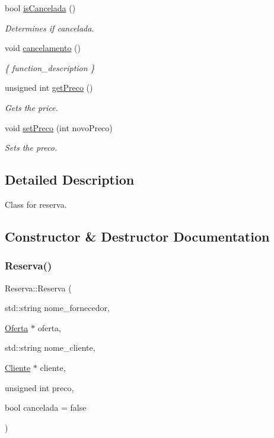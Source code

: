 \begin{DoxyCompactItemize}
bool \hyperlink{classReserva_a1fb3e7e1dfce5960dc888ac9929f014f}{is\+Cancelada} ()
\begin{DoxyCompactList}\small\item\em Determines if cancelada. \end{DoxyCompactList}\item 
\mbox{\label{classReserva_a05435b60142460ad2b0ccf61b7ea4531}} 
void \hyperlink{classReserva_a05435b60142460ad2b0ccf61b7ea4531}{cancelamento} ()
\begin{DoxyCompactList}\small\item\em \{ function\+\_\+description \} \end{DoxyCompactList}\item 
unsigned int \hyperlink{classReserva_a7d6a55cda46a28d62af5870c98cbc3d5}{get\+Preco} ()
\begin{DoxyCompactList}\small\item\em Gets the price. \end{DoxyCompactList}\item 
void \hyperlink{classReserva_ac2d3c756eb1abc03f0661cc97e1600e6}{set\+Preco} (int novo\+Preco)
\begin{DoxyCompactList}\small\item\em Sets the preco. \end{DoxyCompactList}\end{DoxyCompactItemize}


\subsection{Detailed Description}
Class for reserva. 

\subsection{Constructor \& Destructor Documentation}
\mbox{\label{classReserva_a96145a1381e9a9e5bb2091bb17e1d496}} 
\subsubsection{\texorpdfstring{Reserva()}{Reserva()}}
{\footnotesize\ttfamily Reserva\+::\+Reserva (\begin{DoxyParamCaption}\item[{std\+::string}]{nome\+\_\+fornecedor,  }\item[{\hyperlink{classOferta}{Oferta} $\ast$}]{oferta,  }\item[{std\+::string}]{nome\+\_\+cliente,  }\item[{\hyperlink{classCliente}{Cliente} $\ast$}]{cliente,  }\item[{unsigned int}]{preco,  }\item[{bool}]{cancelada = {\ttfamily false} }\end{DoxyParamCaption})}



